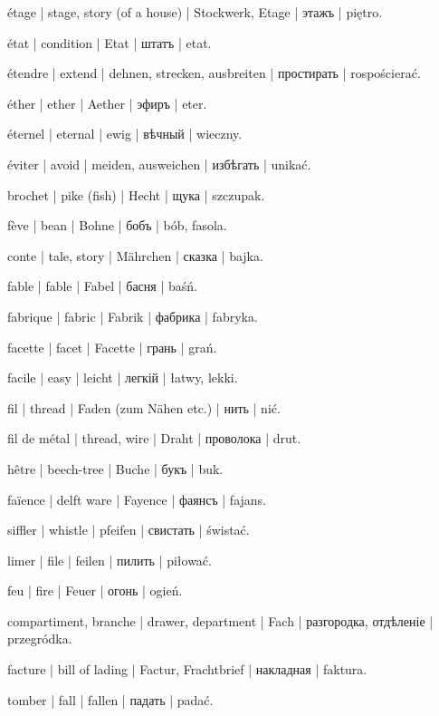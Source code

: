 \begin{outdent}{1em}
étage | stage, story (of a house) | Stockwerk, Etage | этажъ | piętro.

état | condition | Etat | штатъ | etat.

étendre | extend | dehnen, strecken, ausbreiten | простирать | rospościerać.

éther | ether | Aether | эфиръ | eter.

éternel | eternal | ewig | вѣчный | wieczny.

éviter | avoid | meiden, ausweichen | избѣгать | unikać.

brochet | pike (fish) | Hecht | щука | szczupak.


fève | bean | Bohne | бобъ | bób, fasola.

conte | tale, story | Mährchen | сказка | bajka.

fable | fable | Fabel | басня | baśń.

fabrique | fabric | Fabrik | фабрика | fabryka.

facette | facet | Facette | грань | grań.

facile | easy | leicht | легкій | łatwy, lekki.

fil | thread | Faden (zum Nähen etc.) | нить | nić.

\uvsubentry{}
fil de métal | thread, wire | Draht | проволока | drut.

hêtre | beech-tree | Buche | букъ | buk.

faïence | delft ware | Fayence | фаянсъ | fajans.

siffler | whistle | pfeifen | свистать | świstać.

limer | file | feilen | пилить | piłować.

feu | fire | Feuer | огонь | ogień.

compartiment, branche | drawer, department | Fach | разгородка,
отдѣленіе | przegródka.

facture | bill of lading | Factur, Frachtbrief | накладная | faktura.

tomber | fall | fallen | падать | padać.


\end{outdent}
